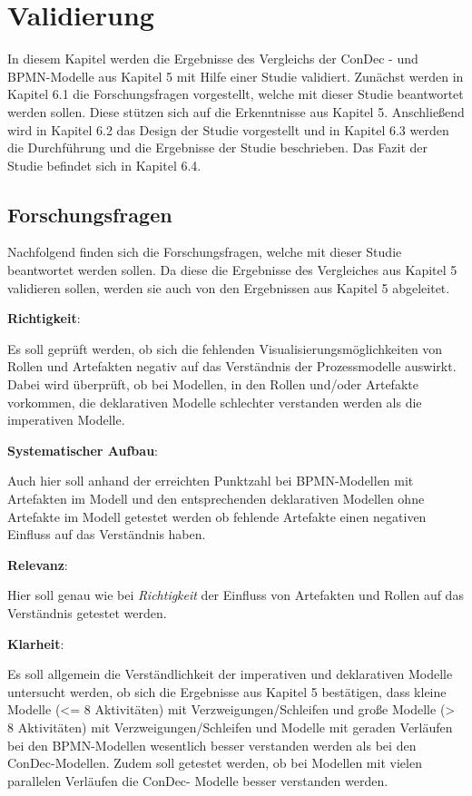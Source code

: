 \chapter{Validierung}\label{sec:chapter7}

In diesem Kapitel werden die Ergebnisse des Vergleichs der ConDec - und BPMN-Modelle aus Kapitel 5 mit Hilfe einer Studie validiert. Zunächst werden in Kapitel 6.1 die Forschungsfragen vorgestellt, welche mit dieser Studie beantwortet werden sollen. Diese stützen sich auf die Erkenntnisse aus Kapitel 5. Anschließend wird in Kapitel 6.2 das Design der Studie vorgestellt und in Kapitel 6.3 werden die Durchführung und die Ergebnisse der Studie beschrieben. Das Fazit der Studie befindet sich in Kapitel 6.4. \newline


\section{Forschungsfragen}
Nachfolgend finden sich die Forschungsfragen, welche mit dieser Studie beantwortet werden sollen. Da diese die Ergebnisse des Vergleiches aus Kapitel 5 validieren sollen, werden sie auch von den Ergebnissen aus Kapitel 5 abgeleitet.\newline

\textbf{Richtigkeit}: 

Es soll geprüft werden, ob sich die fehlenden Visualisierungsmöglichkeiten von Rollen und Artefakten negativ auf das Verständnis der Prozessmodelle auswirkt. Dabei wird überprüft, ob bei Modellen, in den Rollen und/oder Artefakte vorkommen, die deklarativen Modelle schlechter verstanden werden als die imperativen Modelle.\newline

\textbf{Systematischer Aufbau}: 

Auch hier soll anhand der erreichten Punktzahl bei BPMN-Modellen mit Artefakten im Modell und den entsprechenden deklarativen Modellen ohne Artefakte im Modell getestet werden ob fehlende Artefakte einen negativen Einfluss auf das Verständnis haben.\newline

\textbf{Relevanz}: 

Hier soll genau wie bei \textit{Richtigkeit} der Einfluss von Artefakten und Rollen auf das Verständnis getestet werden. \newline

\textbf{Klarheit}: 

Es soll allgemein die Verständlichkeit der imperativen und deklarativen Modelle untersucht werden, ob sich die Ergebnisse aus Kapitel 5 bestätigen, dass kleine Modelle (<= 8 Aktivitäten) mit Verzweigungen/Schleifen und große Modelle (> 8 Aktivitäten) mit Verzweigungen/Schleifen und Modelle mit geraden Verläufen bei den BPMN-Modellen wesentlich besser verstanden werden als bei den ConDec-Modellen.\newline
Zudem soll getestet werden, ob bei Modellen mit vielen parallelen Verläufen die ConDec- Modelle besser verstanden werden.\newline

